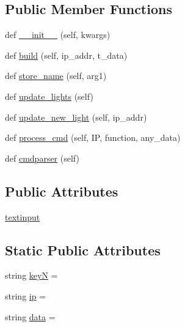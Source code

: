 \subsection*{Public Member Functions}
\begin{DoxyCompactItemize}
\item 
def \hyperlink{classGUI8-5pm_1_1Methods_ad3d84ecaf12cef3229179b6e4a7497f0}{\+\_\+\+\_\+init\+\_\+\+\_\+} (self, kwargs)
\item 
def \hyperlink{classGUI8-5pm_1_1Methods_a798c0b045c52f3791e186dcf7b086aa3}{build} (self, ip\+\_\+addr, t\+\_\+data)
\item 
def \hyperlink{classGUI8-5pm_1_1Methods_a474ca31dcf6413c7b3d8800d1729d79e}{store\+\_\+name} (self, arg1)
\item 
def \hyperlink{classGUI8-5pm_1_1Methods_a7d6fe3c2575dab4560aeafe69a36d910}{update\+\_\+lights} (self)
\item 
def \hyperlink{classGUI8-5pm_1_1Methods_acc36f5fc1abad09a81114d9ff9a19ff7}{update\+\_\+new\+\_\+light} (self, ip\+\_\+addr)
\item 
def \hyperlink{classGUI8-5pm_1_1Methods_a303853ed430eaff9bc4d16a0431c266f}{process\+\_\+cmd} (self, IP, function, any\+\_\+data)
\item 
def \hyperlink{classGUI8-5pm_1_1Methods_a4e22ae305d81d2519d6b9c58073f0574}{cmdparser} (self)
\end{DoxyCompactItemize}
\subsection*{Public Attributes}
\begin{DoxyCompactItemize}
\item 
\hyperlink{classGUI8-5pm_1_1Methods_ae5272965fe06cade1712f5c2db307f14}{textinput}
\end{DoxyCompactItemize}
\subsection*{Static Public Attributes}
\begin{DoxyCompactItemize}
\item 
string \hyperlink{classGUI8-5pm_1_1Methods_a6aab21b5537f2d0ab7e6bf6d9a7aa96b}{keyN} = \textquotesingle{}\textquotesingle{}
\item 
string \hyperlink{classGUI8-5pm_1_1Methods_a598aeed025ae6e48d199e7d9949b3e0a}{ip} = \textquotesingle{}\textquotesingle{}
\item 
string \hyperlink{classGUI8-5pm_1_1Methods_aa649f4722a90b2d0750727fcabf29236}{data} = \textquotesingle{}\textquotesingle{}
\end{DoxyCompactItemize}


